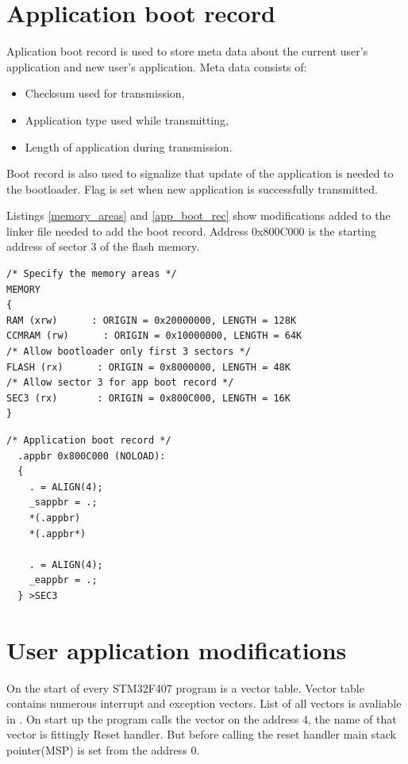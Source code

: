 \section{Application boot record}
\label{boot_record}

Aplication boot record is used to store meta data about the current user's application and new user's application. Meta data consists of: 
\begin{itemize}
    \item Checksum used for transmission,
    \item Application type used while transmitting,
    \item Length of application during transmission.
\end{itemize}
Boot record is also used to signalize that update of the application is needed to the bootloader. Flag is set when new application is successfully transmitted.

Listings \ref{memory_areas} and \ref{app_boot_rec} show modifications added to the linker file needed to add the boot record. Address 0x800C000 is the starting address of sector 3 of the flash memory.

\begin{lstlisting}[frame=single, label={memory_areas}, caption={Memory areas from the linker file.}, captionpos=b]
/* Specify the memory areas */
MEMORY
{
RAM (xrw)      : ORIGIN = 0x20000000, LENGTH = 128K
CCMRAM (rw)      : ORIGIN = 0x10000000, LENGTH = 64K
/* Allow bootloader only first 3 sectors */
FLASH (rx)      : ORIGIN = 0x8000000, LENGTH = 48K 
/* Allow sector 3 for app boot record */
SEC3 (rx)		: ORIGIN = 0x800C000, LENGTH = 16K
}
\end{lstlisting}

\begin{lstlisting}[frame=single, label={app_boot_rec}, caption={Application boot record from the linker file.}, captionpos=b]
  /* Application boot record */
  .appbr 0x800C000 (NOLOAD):
  {
    . = ALIGN(4);
    _sappbr = .;       
    *(.appbr)
    *(.appbr*)
    
    . = ALIGN(4);
    _eappbr = .;   
  } >SEC3
\end{lstlisting}


\section{User application modifications}

On the start of every STM32F407 program is a vector table. Vector table contains numerous interrupt and exception vectors. List of all vectors is avaliable in \citep[p.~372]{stm32f407_ref_man}. On start up the program calls the vector on the address 4, the name of that vector is fittingly Reset handler. But before calling the reset handler main stack pointer(MSP) is set from the address 0. 

